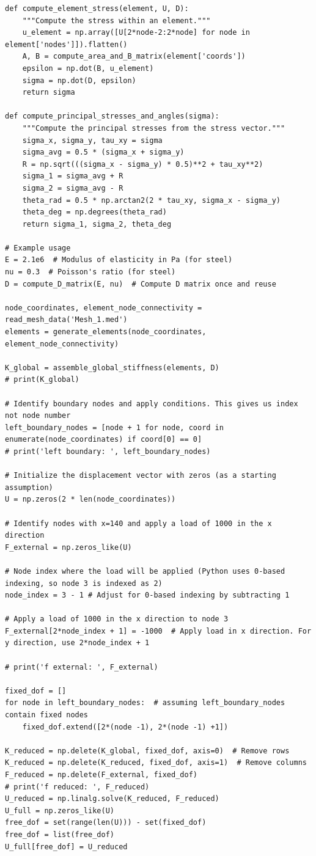 \documentclass[12pt]{report}
\begin{document}
\begin{lstlisting}[style=mypython]
def compute_element_stress(element, U, D):
	"""Compute the stress within an element."""
	u_element = np.array([U[2*node-2:2*node] for node in element['nodes']]).flatten()
	A, B = compute_area_and_B_matrix(element['coords'])
	epsilon = np.dot(B, u_element)
	sigma = np.dot(D, epsilon)
	return sigma

def compute_principal_stresses_and_angles(sigma):
	"""Compute the principal stresses from the stress vector."""
	sigma_x, sigma_y, tau_xy = sigma
	sigma_avg = 0.5 * (sigma_x + sigma_y)
	R = np.sqrt(((sigma_x - sigma_y) * 0.5)**2 + tau_xy**2)
	sigma_1 = sigma_avg + R
	sigma_2 = sigma_avg - R
	theta_rad = 0.5 * np.arctan2(2 * tau_xy, sigma_x - sigma_y)
	theta_deg = np.degrees(theta_rad)
	return sigma_1, sigma_2, theta_deg

# Example usage
E = 2.1e6  # Modulus of elasticity in Pa (for steel)
nu = 0.3  # Poisson's ratio (for steel)
D = compute_D_matrix(E, nu)  # Compute D matrix once and reuse

node_coordinates, element_node_connectivity = read_mesh_data('Mesh_1.med')
elements = generate_elements(node_coordinates, element_node_connectivity)

K_global = assemble_global_stiffness(elements, D)
# print(K_global)

# Identify boundary nodes and apply conditions. This gives us index not node number
left_boundary_nodes = [node + 1 for node, coord in enumerate(node_coordinates) if coord[0] == 0]
# print('left boundary: ', left_boundary_nodes)

# Initialize the displacement vector with zeros (as a starting assumption)
U = np.zeros(2 * len(node_coordinates))

# Identify nodes with x=140 and apply a load of 1000 in the x direction
F_external = np.zeros_like(U)

# Node index where the load will be applied (Python uses 0-based indexing, so node 3 is indexed as 2)
node_index = 3 - 1 # Adjust for 0-based indexing by subtracting 1

# Apply a load of 1000 in the x direction to node 3
F_external[2*node_index + 1] = -1000  # Apply load in x direction. For y direction, use 2*node_index + 1

# print('f external: ', F_external)

fixed_dof = []
for node in left_boundary_nodes:  # assuming left_boundary_nodes contain fixed nodes
	fixed_dof.extend([2*(node -1), 2*(node -1) +1])

K_reduced = np.delete(K_global, fixed_dof, axis=0)  # Remove rows
K_reduced = np.delete(K_reduced, fixed_dof, axis=1)  # Remove columns
F_reduced = np.delete(F_external, fixed_dof)
# print('f reduced: ', F_reduced)
U_reduced = np.linalg.solve(K_reduced, F_reduced)
U_full = np.zeros_like(U)
free_dof = set(range(len(U))) - set(fixed_dof)
free_dof = list(free_dof)
U_full[free_dof] = U_reduced



\end{lstlisting}
\end{document}
